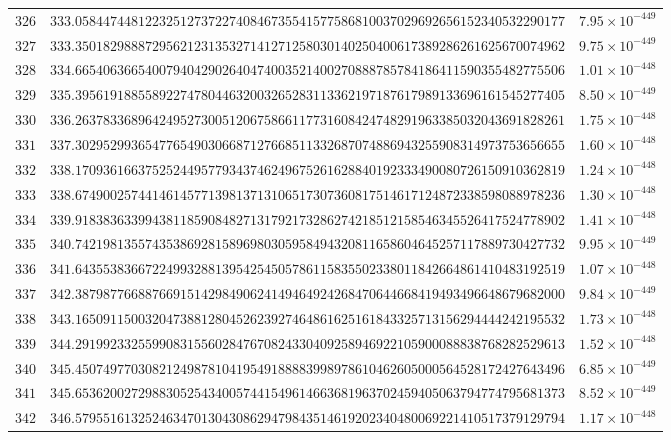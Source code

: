 \documentclass[12pt,reqno]{amsart}
\theoremstyle{remark}
\begin{document}
\begin{longtable}{clc}
$326$ & $333.0584474481223251273722740846735541577586810037029692656152340532290177$ & $7.95\times 10^{-449}$ \\
$327$ & $333.3501829888729562123135327141271258030140250400617389286261625670074962$ & $9.75\times 10^{-449}$ \\
$328$ & $334.6654063665400794042902640474003521400270888785784186411590355482775506$ & $1.01\times 10^{-448}$ \\
$329$ & $335.3956191885589227478044632003265283113362197187617989133696161545277405$ & $8.50\times 10^{-449}$ \\
$330$ & $336.2637833689642495273005120675866117731608424748291963385032043691828261$ & $1.75\times 10^{-448}$ \\
$331$ & $337.3029529936547765490306687127668511332687074886943255908314973753656655$ & $1.60\times 10^{-448}$ \\
$332$ & $338.1709361663752524495779343746249675261628840192333490080726150910362819$ & $1.24\times 10^{-448}$ \\
$333$ & $338.6749002574414614577139813713106517307360817514617124872338598088978236$ & $1.30\times 10^{-448}$ \\
$334$ & $339.9183836339943811859084827131792173286274218512158546345526417524778902$ & $1.41\times 10^{-448}$ \\
$335$ & $340.7421981355743538692815896980305958494320811658604645257117889730427732$ & $9.95\times 10^{-449}$ \\
$336$ & $341.6435538366722499328813954254505786115835502338011842664861410483192519$ & $1.07\times 10^{-448}$ \\
$337$ & $342.3879877668876691514298490624149464924268470644668419493496648679682000$ & $9.84\times 10^{-449}$ \\
$338$ & $343.1650911500320473881280452623927464861625161843325713156294444242195532$ & $1.73\times 10^{-448}$ \\
$339$ & $344.2919923325599083155602847670824330409258946922105900088838768282529613$ & $1.52\times 10^{-448}$ \\
$340$ & $345.4507497703082124987810419549188883998978610462605000564528172427643496$ & $6.85\times 10^{-449}$ \\
$341$ & $345.6536200272988305254340057441549614663681963702459405063794774795681373$ & $8.52\times 10^{-449}$ \\
$342$ & $346.5795516132524634701304308629479843514619202340480069221410517379129794$ & $1.17\times 10^{-448}$ \\

\end{longtable}
\end{document}
